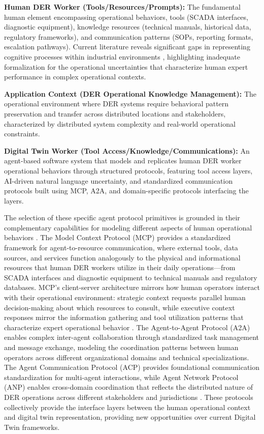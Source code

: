\documentclass[12pt,a4paper]{article}
\begin{document}
\textbf{Human DER Worker (Tools/Resources/Prompts):} The fundamental human element encompassing operational behaviors, tools (SCADA interfaces, diagnostic equipment), knowledge resources (technical manuals, historical data, regulatory frameworks), and communication patterns (SOPs, reporting formats, escalation pathways). Current literature reveals significant gaps in representing cognitive processes within industrial environments \cite{10.1007/s44163-022-00020-w} \cite{10.1016/j.apergo.2018.07.016}, highlighting inadequate formalization for the operational uncertainties that characterize human expert performance in complex operational contexts.

\textbf{Application Context (DER Operational Knowledge Management):} The operational environment where DER systems require behavioral pattern preservation and transfer across distributed locations and stakeholders, characterized by distributed system complexity and real-world operational constraints.

\textbf{Digital Twin Worker (Tool Access/Knowledge/Communications):} An agent-based software system that models and replicates human DER worker operational behaviors through structured protocols, featuring tool access layers, AI-driven natural language uncertainty, and standardized communication protocols built using MCP, A2A, and domain-specific protocols interfacing the layers. 

The selection of these specific agent protocol primitives is grounded in their complementary capabilities for modeling different aspects of human operational behaviors \cite{2504.16736v2} \cite{2505.02279}. The Model Context Protocol (MCP) provides a standardized framework for agent-to-resource communication, where external tools, data sources, and services function analogously to the physical and informational resources that human DER workers utilize in their daily operations—from SCADA interfaces and diagnostic equipment to technical manuals and regulatory databases. MCP's client-server architecture mirrors how human operators interact with their operational environment: strategic context requests parallel human decision-making about which resources to consult, while executive context responses mirror the information gathering and tool utilization patterns that characterize expert operational behavior \cite{2504.16736v2}. The Agent-to-Agent Protocol (A2A) enables complex inter-agent collaboration through standardized task management and message exchange, modeling the coordination patterns between human operators across different organizational domains and technical specializations. The Agent Communication Protocol (ACP) provides foundational communication standardization for multi-agent interactions, while Agent Network Protocol (ANP) enables cross-domain coordination that reflects the distributed nature of DER operations across different stakeholders and jurisdictions \cite{2505.02279}. These protocols collectively provide the interface layers between the human operational context and digital twin representation, providing new opportunities over current Digital Twin frameworks.
\end{document}
